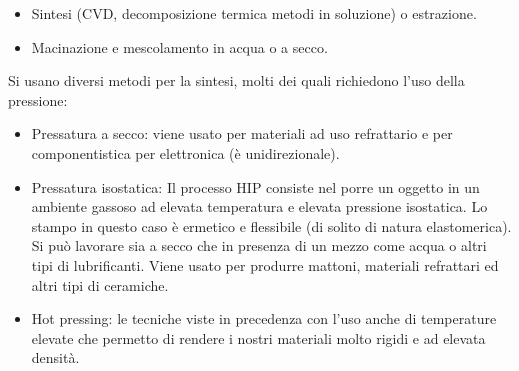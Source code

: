 \begin{itemize}
    \item Sintesi (CVD, decomposizione termica  metodi in soluzione) o estrazione.
    \item Macinazione e mescolamento in acqua o a secco. 
\end{itemize}
Si usano diversi metodi per la sintesi, molti dei quali richiedono l'uso della pressione:
\begin{itemize}
    \item Pressatura a secco: viene usato per materiali ad uso refrattario e per componentistica per elettronica (è unidirezionale).
    \item Pressatura isostatica: Il processo HIP consiste nel porre un oggetto in un ambiente gassoso ad elevata temperatura e elevata pressione isostatica. Lo stampo in questo caso è ermetico e flessibile (di solito di natura elastomerica). Si può lavorare sia a secco che in presenza di un mezzo come acqua o altri tipi di lubrificanti. Viene usato per produrre mattoni, materiali refrattari ed altri tipi di ceramiche.
    \item Hot pressing: le tecniche viste in precedenza con l'uso anche di temperature elevate che permetto di rendere i nostri materiali molto rigidi e ad elevata densità.
\end{itemize}

